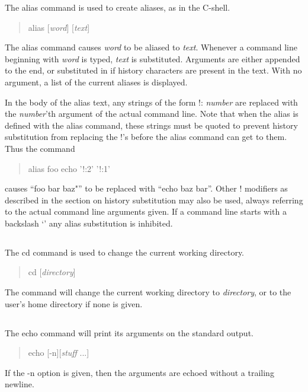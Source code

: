 The {\cb alias} command is used to create aliases, as in the C-shell.
\begin{quote}\vt
alias [{\it word\/}] [{\it text\/}]
\end{quote}
The {\cb alias} command causes {\it word\/} to be aliased to {\it
text}.  Whenever a command line beginning with {\it word} is typed,
{\it text} is substituted.  Arguments are either appended to the end,
or substituted in if history characters are present in the text.  With
no argument, a list of the current aliases is displayed.

In the body of the alias text, any strings of the form {\vt !:}{\it
number} are replaced with the {\it number\/}'th argument of the actual
command line.  Note that when the alias is defined with the {\cb
alias} command, these strings must be quoted to prevent history
substitution from replacing the {\vt !}'s before the alias command can
get to them.  Thus the command
\begin{quote}\vt
alias foo echo '!:2' '!:1'
\end{quote}
causes ``{\vt foo bar baz"}'' to be replaced with ``{\vt echo baz
bar}''.  Other {\vt !} modifiers as described in the section on
history substitution may also be used, always referring to the actual
command line arguments given.  If a command line starts with a
backslash `{\vt {}}' any alias substitution is inhibited.

\subsection{}


The {\cb cd} command is used to change the current working directory.
\begin{quote}\vt
cd [{\it directory\/}]
\end{quote}
The command will change the current working directory to {\it
directory\/}, or to the user's home directory if none is given.

\subsection{}


The {\cb echo} command will print its arguments on the standard output.
\begin{quote}\vt
echo [-n][{\it stuff} ...]
\end{quote}
If the {\vt -n} option is given, then the arguments are echoed without
a trailing newline.

